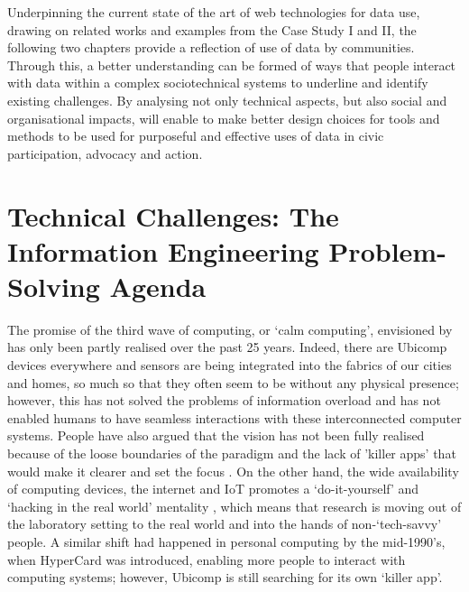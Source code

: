Underpinning the current state of the art of web technologies for data use, drawing on related works and examples from the Case Study I and II, the following two chapters provide a reflection of use of data by communities. Through this, a better understanding can be formed of ways that people interact with data within a complex sociotechnical systems to underline and identify existing challenges. By analysing not only technical aspects, but also social and organisational impacts, will enable to make better design choices for tools and methods to be used for purposeful and effective uses of data in civic participation, advocacy and action.

\section[Technical Challenges]{Technical Challenges: The Information Engineering Problem-Solving Agenda}
\label{sec:tech_chall}
The promise of the third wave of computing, or `calm computing', envisioned by \cite{weiser_computer_1991} has only been partly realised over the past 25 years. Indeed, there are Ubicomp devices everywhere and sensors are being integrated into the fabrics of our cities and homes, so much so that they often seem to be without any physical presence; however, this has not solved the problems of information overload and has not enabled humans to have seamless interactions with these interconnected computer systems. People have also argued that the vision has not been fully realised because of the loose boundaries of the paradigm and the lack of 'killer apps' that would make it clearer and set the focus \citep{sorce_human--human_2017}. On the other hand, the wide availability of computing devices, the internet and IoT promotes a `do-it-yourself' and `hacking in the real world' mentality \citep{abowd_what_2012}, which means that research is moving out of the laboratory setting to the real world and into the hands of non-`tech-savvy' people. A similar shift had happened in personal computing by the mid-1990's, when HyperCard was introduced, enabling more people to interact with computing systems; however, Ubicomp is still searching for its own `killer app'.
\newline

